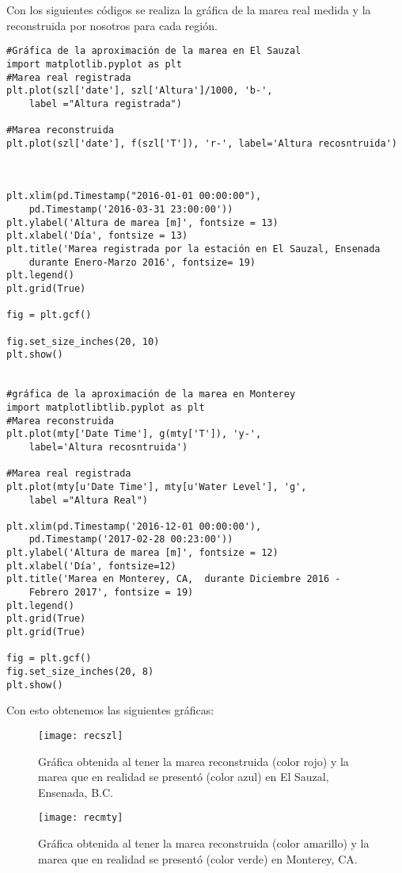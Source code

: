 Con los siguientes códigos se realiza la gráfica de la marea real medida y la reconstruida por nosotros para cada región.
\begin{verbatim}
#Gráfica de la aproximación de la marea en El Sauzal
import matplotlib.pyplot as plt
#Marea real registrada
plt.plot(szl['date'], szl['Altura']/1000, 'b-', 
	label ="Altura registrada")

#Marea reconstruida
plt.plot(szl['date'], f(szl['T']), 'r-', label='Altura recosntruida')
                          


plt.xlim(pd.Timestamp("2016-01-01 00:00:00"), 
	pd.Timestamp('2016-03-31 23:00:00'))
plt.ylabel('Altura de marea [m]', fontsize = 13)
plt.xlabel('Día', fontsize = 13)
plt.title('Marea registrada por la estación en El Sauzal, Ensenada 
	durante Enero-Marzo 2016', fontsize= 19)
plt.legend()
plt.grid(True) 

fig = plt.gcf()

fig.set_size_inches(20, 10)
plt.show()


#gráfica de la aproximación de la marea en Monterey
import matplotlibtlib.pyplot as plt
#Marea reconstruida
plt.plot(mty['Date Time'], g(mty['T']), 'y-', 
	label='Altura recosntruida')

#Marea real registrada
plt.plot(mty[u'Date Time'], mty[u'Water Level'], 'g', 
	label ="Altura Real")

plt.xlim(pd.Timestamp('2016-12-01 00:00:00'), 
	pd.Timestamp('2017-02-28 00:23:00'))
plt.ylabel('Altura de marea [m]', fontsize = 12)
plt.xlabel('Día', fontsize=12)
plt.title('Marea en Monterey, CA,  durante Diciembre 2016 - 
	Febrero 2017', fontsize = 19)
plt.legend()
plt.grid(True)
plt.grid(True)

fig = plt.gcf()
fig.set_size_inches(20, 8)
plt.show()
\end{verbatim}

Con esto obtenemos las siguientes gráficas:
\begin{figure}[ht!]
\centering
\texttt{[image: recszl]}
\caption{Gráfica obtenida al tener la marea reconstruida (color rojo) y la marea que en realidad se presentó (color azul) en El Sauzal, Ensenada, B.C.}
\label{recs}
\end{figure}
\begin{figure}[ht!]
\centering
\texttt{[image: recmty]}
\caption{Gráfica obtenida al tener la marea reconstruida (color amarillo) y la marea que en realidad se presentó (color verde) en Monterey, CA.}
\label{recm}
\end{figure}

